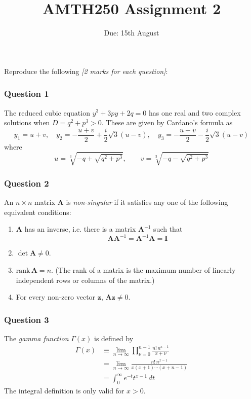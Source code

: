 \documentclass[11pt,a4paper]{article}
\title{AMTH250 \hfill  Assignment 2 }
\author{Due: 15th August}
\date{}
\begin{document}
\maketitle

\medskip


\noindent Reproduce the following \textsl{[2 marks for each question]}:

\medskip

\subsubsection*{Question 1}

The reduced cubic equation $y^3 + 3py + 2q = 0$ has one real
and two complex solutions when $D = q^2 + p^3 > 0$.
These are given by Cardano's formula as
$$ y_1 = u + v, \quad
   y_2 = -\frac{u+v}{2} + \frac{i}{2} \sqrt{3} (u-v), \quad
   y_3 = -\frac{u+v}{2} - \frac{i}{2} \sqrt{3} (u-v) $$
where
$$ u = \sqrt[3]{-q + \sqrt{q^2 + p^3}}, \qquad
   v = \sqrt[3]{-q - \sqrt{q^2 + p^3}}  $$

\subsubsection*{Question 2}

An $n \times n$ matrix $\mathbf{A}$ is \textsl{non-singular}
if it satisfies any one of the following equivalent conditions:
\begin{enumerate} 
  \item $\mathbf{A}$ has an inverse, i.e. there is a matrix
     $\mathbf{A}^{-1}$ such that 
     $$ \mathbf{A} \mathbf{A}^{-1} =  \mathbf{A}^{-1} \mathbf{A}  
         = \mathbf{I} $$
  \item $\det \mathbf{A} \neq 0$.
  \item $ \text{rank} \, \mathbf{A} = n$. (The rank of a matrix
    is the maximum number of linearly independent rows or
    columns of the matrix.)
  \item For every non-zero vector $\mathbf{z}$, 
     $\mathbf{A} \mathbf{z} \neq 0$.
\end{enumerate}

\subsubsection*{Question 3}

The \emph{gamma function} $\Gamma(x)$ is defined by
\begin{align*}
   \Gamma(x) &\equiv
   \lim_{n \rightarrow \infty} \prod_{\nu = 0}^{n-1}
     \frac{n! \, n^{x-1}}{x+ \nu} \\
    &= \lim_{n \rightarrow \infty} \frac{n! \, n^{x-1}}
     {x (x+1) \cdots (x+n-1)} \\
    &= \int_0^{\infty} e^{-t} t^{x-1} \, dt   
\end{align*}
The integral definition is only valid for $x > 0$.
\end{document}
